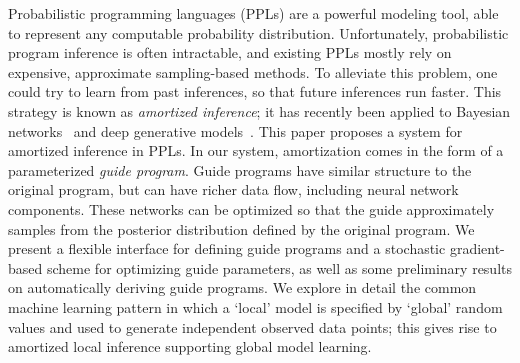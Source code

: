 
Probabilistic programming languages (PPLs) are a powerful modeling tool, able to represent any computable probability distribution.
%
Unfortunately, probabilistic program inference is often intractable, and existing PPLs mostly rely on expensive, approximate sampling-based methods.
%
To alleviate this problem, one could try to learn from past inferences, so that future inferences run faster.
This strategy is known as \emph{amortized inference}; it has recently been applied to Bayesian networks~\cite{StochasticInverses,NeuralStochasticInverses} and deep generative models~\cite{NVIL,AEVB,DLGM}.
%
This paper proposes a system for amortized inference in PPLs.
In our system, amortization comes in the form of a parameterized \emph{guide program}.
Guide programs have similar structure to the original program, but can have richer data flow, including neural network components.
These networks can be optimized so that the guide approximately samples from the posterior distribution defined by the original program.
We present a flexible interface for defining guide programs and a stochastic gradient-based scheme for optimizing guide parameters, as well as some preliminary results on automatically deriving guide programs.
We explore in detail the common machine learning pattern in which a `local' model is specified by `global' random values and used to generate independent observed data points; this gives rise to amortized local inference supporting global model learning.
%

